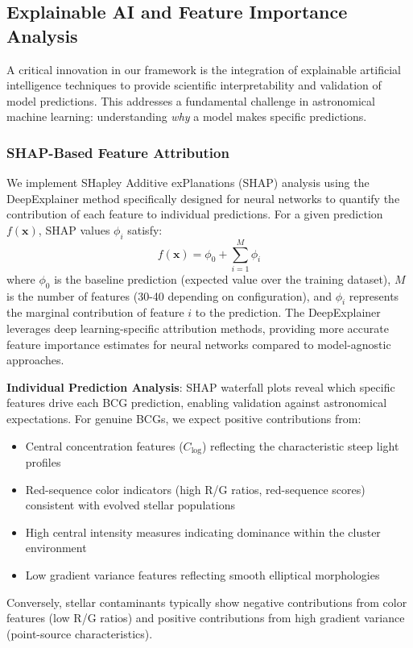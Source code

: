 \documentclass[twocolumn,10pt]{aastex631}
\begin{document}
\subsection{Explainable AI and Feature Importance Analysis}

A critical innovation in our framework is the integration of explainable artificial intelligence techniques to provide scientific interpretability and validation of model predictions. This addresses a fundamental challenge in astronomical machine learning: understanding \emph{why} a model makes specific predictions.

\subsubsection{SHAP-Based Feature Attribution}

We implement SHapley Additive exPlanations (SHAP) analysis using the DeepExplainer method specifically designed for neural networks to quantify the contribution of each feature to individual predictions. For a given prediction $f(\mathbf{x})$, SHAP values $\phi_i$ satisfy:
\begin{equation}
f(\mathbf{x}) = \phi_0 + \sum_{i=1}^{M} \phi_i
\end{equation}
where $\phi_0$ is the baseline prediction (expected value over the training dataset), $M$ is the number of features (30-40 depending on configuration), and $\phi_i$ represents the marginal contribution of feature $i$ to the prediction. The DeepExplainer leverages deep learning-specific attribution methods, providing more accurate feature importance estimates for neural networks compared to model-agnostic approaches.

\textbf{Individual Prediction Analysis}: SHAP waterfall plots reveal which specific features drive each BCG prediction, enabling validation against astronomical expectations. For genuine BCGs, we expect positive contributions from:
\begin{itemize}
\item Central concentration features ($C_{\text{log}}$) reflecting the characteristic steep light profiles
\item Red-sequence color indicators (high R/G ratios, red-sequence scores) consistent with evolved stellar populations
\item High central intensity measures indicating dominance within the cluster environment
\item Low gradient variance features reflecting smooth elliptical morphologies
\end{itemize}
Conversely, stellar contaminants typically show negative contributions from color features (low R/G ratios) and positive contributions from high gradient variance (point-source characteristics).
\end{document}
